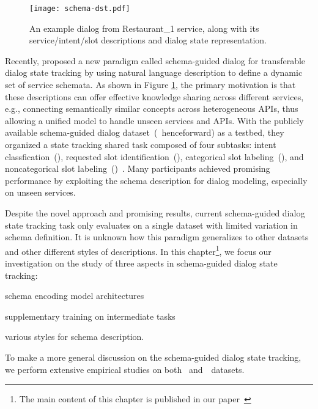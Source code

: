 \begin{figure}[!ht]
\centering
  \texttt{[image: schema-dst.pdf]}
  \caption{\label{fig:schema-dst} An example dialog from Restaurant\_1 service, along with its service/intent/slot descriptions and dialog state representation.}
\end{figure}


Recently, \citet{rastogi2019towards} proposed a new paradigm called
schema-guided dialog for transferable dialog state tracking by using
natural language description to define a dynamic set of service
schemata. As shown in Figure \ref{fig:schema-dst}, the primary
motivation is that these descriptions can offer effective knowledge
sharing across different services, e.g., connecting semantically
similar concepts across heterogeneous APIs, thus allowing a unified
model to handle unseen services and APIs. With the publicly available
schema-guided dialog dataset~(\sgdst~henceforward) as a
testbed, they organized a state tracking shared task composed of four subtasks:
intent classfication~(\IC), requested slot identification~(\RSI),
categorical slot labeling~(\CSL), and noncategorical slot
labeling~(\NSL)~\cite{rastogi2020schema}. Many participants achieved
promising performance by exploiting the schema description for dialog
modeling, especially on unseen services.

Despite the novel approach and promising results, current
schema-guided dialog state tracking task only evaluates on a single
dataset with limited variation in schema definition. It is unknown how
this paradigm generalizes to other datasets and other different styles
of descriptions. In this chapter\footnote{The main content of this
  chapter is published in our paper~\cite{cao2021schema}}, we focus
our investigation on the study of three aspects in schema-guided
dialog state tracking:
\begin{inparaenum}[(1)]
\item schema encoding model architectures
\item supplementary training on intermediate tasks
\item various styles for schema description.
\end{inparaenum}
To make a more general discussion on
the schema-guided dialog state tracking, we perform extensive
empirical studies on both \sgdst~and~\multiwoz~datasets.

